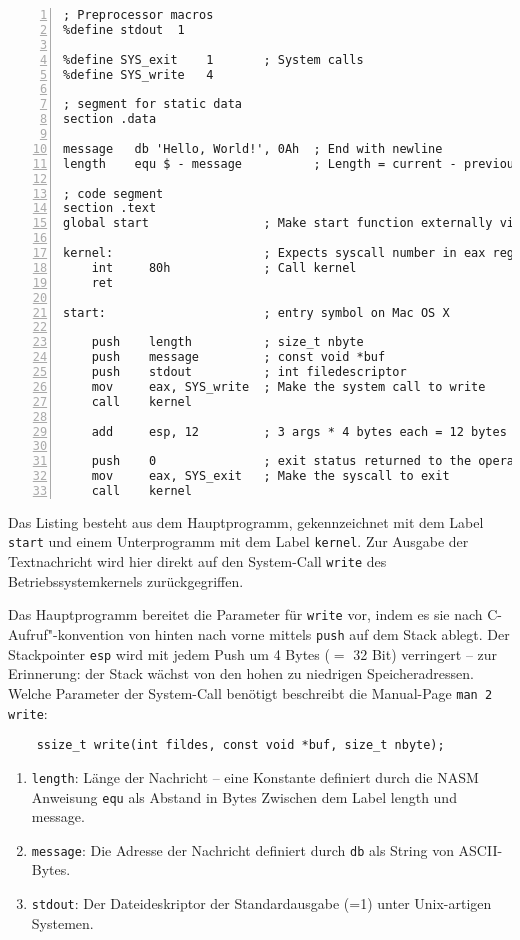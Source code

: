 \begin{lstlisting}[numbers=left,caption=hello.asm]
; Preprocessor macros
%define stdout  1

%define SYS_exit    1       ; System calls
%define SYS_write   4

; segment for static data
section .data

message   db 'Hello, World!', 0Ah  ; End with newline
length    equ $ - message          ; Length = current - previous address

; code segment
section .text
global start                ; Make start function externally visible for linker

kernel:                     ; Expects syscall number in eax register
    int     80h             ; Call kernel
    ret

start:                      ; entry symbol on Mac OS X

    push    length          ; size_t nbyte
    push    message         ; const void *buf
    push    stdout          ; int filedescriptor
    mov     eax, SYS_write  ; Make the system call to write
    call    kernel

    add     esp, 12         ; 3 args * 4 bytes each = 12 bytes

    push    0               ; exit status returned to the operating system
    mov     eax, SYS_exit   ; Make the syscall to exit
    call    kernel
\end{lstlisting}

Das Listing besteht aus dem Hauptprogramm, gekennzeichnet mit dem Label \texttt{start} und einem Unterprogramm mit dem Label \texttt{kernel}. Zur Ausgabe der Textnachricht wird hier direkt auf den System-Call \texttt{write} des Betriebssystemkernels zurückgegriffen.

Das Hauptprogramm bereitet die Parameter für {\tt write} vor, indem es sie nach C-Aufruf"-konvention von hinten nach vorne mittels {\tt push} auf dem Stack ablegt. Der Stackpointer {\tt esp} wird mit jedem Push um 4 Bytes ($=$ 32 Bit) verringert -- zur Erinnerung: der Stack wächst von den hohen zu niedrigen Speicheradressen. Welche Parameter der System-Call benötigt beschreibt die Manual-Page {\tt man 2 write}:

\begin{lstlisting}
    ssize_t write(int fildes, const void *buf, size_t nbyte);
\end{lstlisting}

\begin{enumerate}
\item {\tt length}: Länge der Nachricht – eine Konstante definiert durch die
NASM Anweisung {\tt equ} als Abstand in Bytes Zwischen dem Label length und message.
\item {\tt message}: Die Adresse der Nachricht definiert durch {\tt db} als String von ASCII-Bytes.
\item {\tt stdout}: Der Dateideskriptor der Standardausgabe (=1) unter Unix-artigen Systemen.
\end{enumerate}

